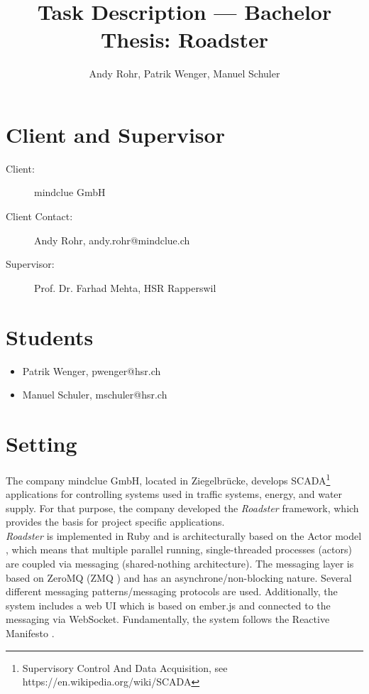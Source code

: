 \documentclass[a4paper]{article}
\title{Task Description --- Bachelor Thesis: Roadster}
\author{Andy Rohr, Patrik Wenger, Manuel Schuler}
\begin{document}
\lstset{language=ruby}
\pagestyle{fancyplain}
\fancyhf{}
\setlength{\headheight}{50pt}
\maketitle
{}

\section{Client and Supervisor}
\begin{description}
	\item [Client:] mindclue GmbH
	\item [Client Contact:] Andy Rohr, andy.rohr@mindclue.ch
	\item [Supervisor:] Prof. Dr. Farhad Mehta, HSR Rapperswil
\end{description}


\section{Students}
\begin{itemize}
	\item Patrik Wenger, pwenger@hsr.ch
	\item Manuel Schuler, mschuler@hsr.ch
\end{itemize}

\section{Setting}
The company mindclue GmbH, located in Ziegelbrücke, develops
SCADA\footnote{Supervisory Control And Data Acquisition, see
https://en.wikipedia.org/wiki/SCADA} applications for controlling systems used
in traffic systems, energy, and water supply. For that purpose, the company
developed the \emph{Roadster} framework, which provides the basis for project
specific applications.\\

\emph{Roadster} is implemented in Ruby and is architecturally based on the
Actor model \cite{wiki:actor-model}, which means that multiple parallel running,
single-threaded processes (actors) are coupled via messaging (shared-nothing
architecture). The messaging layer is based on ZeroMQ (ZMQ \cite{zeromq}) and
has an asynchrone/non-blocking nature. Several different messaging
patterns/messaging protocols are used. Additionally, the system includes a web
UI which is based on ember.js and connected to the messaging via WebSocket.
Fundamentally, the system follows the Reactive Manifesto
\cite{reactivemanifesto}.\\
\end{document}
